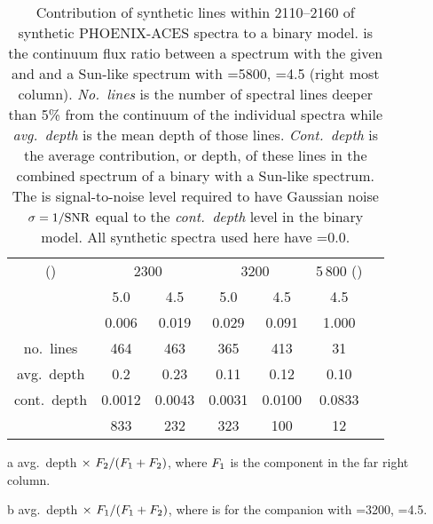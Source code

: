 
\begin{table}
    \centering
    \begin{threeparttable}[b]
        \caption[Analysis of spectral line depths.]{Contribution of synthetic lines within 2110--2160\nm{} of synthetic {PHOENIX-ACES} spectra to a binary model.
            \FtwoFone{} is the continuum flux ratio between a spectrum with the given \Teff{} and \Logg{} and a Sun-like spectrum with \Teff{}=5800, \Logg{}=4.5 (right most column).
            \emph{No.~lines} is the number of spectral lines deeper than 5\% from the continuum of the individual spectra while \emph{avg.~depth} is the mean depth of those lines.
            \emph{Cont.~depth} is the average contribution, or depth, of these lines in the combined spectrum of a binary with a Sun-like spectrum.
            The \snr{} is signal-to-noise level required to have Gaussian noise \(\sigma=1/\textrm{SNR}{}\) equal to the \emph{cont.~depth} level in the binary model.
            All synthetic spectra used here have \feh{}=0.0.}
        \begin{tabular}{*7c}
            \toprule
            \Teff{} (\K{}) & \multicolumn{2}{c}{2300} & \multicolumn{2}{c}{3200} & 5\,800 (\Fone{})\\
           \Logg{} & 5.0 & 4.5 & 5.0 & 4.5 & 4.5 \\
            \midrule
            \FtwoFone{} & 0.006 & 0.019 & 0.029 & 0.091 & 1.000 \\
            no.~lines & 464 & 463 & 365 & 413 & 31 \\
            avg.~depth & 0.2 & 0.23 & 0.11 & 0.12 & 0.10 \\
            cont.~depth\tnote{a} &  0.0012 & 0.0043 &  0.0031 & 0.0100 & 0.0833\tnote{b} \\
            \snr{} & 833 & 232 & 323 & 100 & 12 \\
            \bottomrule
        \end{tabular}\label{tab:line_contributions}
        \begin{tablenotes}
            \item [a] avg.~depth \(\times~{F}_{2}{} / ({F}_{1}{} + {F}_{2}{})\), where \({F}_{1}{}\) is the component in the far right column.
            \item[b] avg.~depth \(\times~{F}_{1}{} / ({F}_{1}{} + {F}_{2}{})\), where \Ftwo{} is for the companion with \Teff{}=3200, \Logg{}=4.5.
        \end{tablenotes}
    \end{threeparttable}
\end{table}
